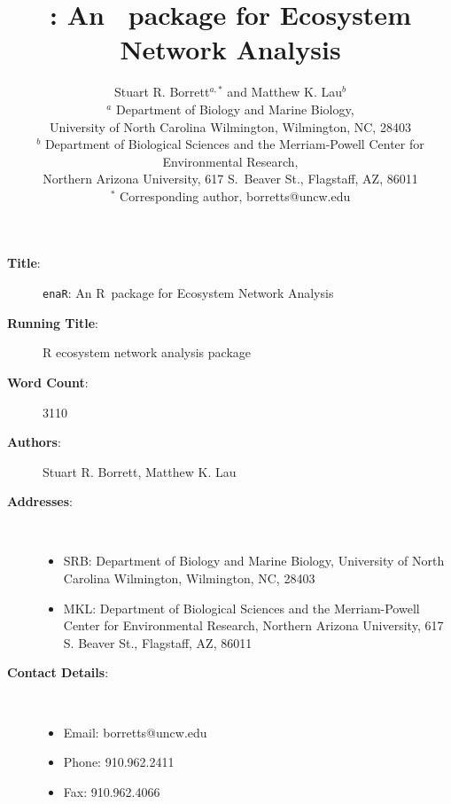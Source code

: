 \documentclass[11pt]{article}
\title{\enaR: An \R\ package for Ecosystem Network Analysis}
\author{Stuart R. Borrett$^{a,*}$ and Matthew K. Lau$^b$
  \\ {\footnotesize $^a$ Department of Biology and Marine Biology,} \\
    {\footnotesize University of North Carolina Wilmington, Wilmington, NC, 28403}
  \\ {\footnotesize $^b$ Department of Biological Sciences and the
    Merriam-Powell Center for Environmental Research,} \\
{\footnotesize Northern Arizona University, 617 S.\ Beaver St., Flagstaff, AZ, 86011}
  \\ {\footnotesize $^*$ Corresponding author, borretts@uncw.edu} }
\newcommand{\R}{R}
\newcommand{\enaR}{\texttt{enaR}}
\begin{document}

\begin{description}
  \item[\textbf{Title}:] \enaR: An \R\ package for Ecosystem Network Analysis
  \item[\textbf{Running Title}:] R ecosystem network analysis package
  \item[\textbf{Word Count}:] 3110
  \item[\textbf{Authors}:] Stuart R. Borrett, Matthew K. Lau
  \item[\textbf{Addresses}:] \
    \begin{itemize}
    \item SRB: Department of Biology and Marine Biology, University of
      North Carolina Wilmington, Wilmington, NC, 28403
    \item MKL: Department of Biological Sciences and the
      Merriam-Powell Center for Environmental Research, Northern
      Arizona University, 617 S. Beaver St., Flagstaff, AZ, 86011
    \end{itemize}
  \item[\textbf{Contact Details}:] \
    \begin{itemize}
    \item Email: borretts@uncw.edu
    \item Phone: 910.962.2411
    \item Fax: 910.962.4066
    \end{itemize}
\end{description}

\pagebreak

\maketitle
\end{document}
